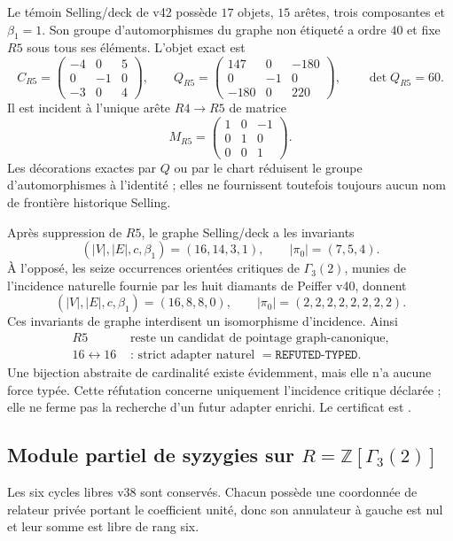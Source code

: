 \documentclass[11pt,a4paper]{article}
\begin{document}
Le témoin Selling/deck de v42 possède $17$ objets, $15$ arêtes, trois composantes et $\beta_1=1$. Son groupe d'automorphismes du graphe non étiqueté a ordre $40$ et fixe $R5$ sous tous ses éléments. L'objet exact est
\[
 C_{R5}=\begin{pmatrix}-4&0&5\\0&-1&0\\-3&0&4\end{pmatrix},
 \qquad
 Q_{R5}=\begin{pmatrix}147&0&-180\\0&-1&0\\-180&0&220\end{pmatrix},
 \qquad \det Q_{R5}=60.
\]
Il est incident à l'unique arête $R4\to R5$ de matrice
\[
 M_{R5}=\begin{pmatrix}1&0&-1\\0&1&0\\0&0&1\end{pmatrix}.
\]
Les décorations exactes par $Q$ ou par le chart réduisent le groupe d'automorphismes à l'identité ; elles ne fournissent toutefois toujours aucun nom de frontière historique Selling.

Après suppression de $R5$, le graphe Selling/deck a les invariants
\[
 (|V|,|E|,c,\beta_1)=(16,14,3,1),
 \qquad
 |\pi_0|=(7,5,4).
\]
À l'opposé, les seize occurrences orientées critiques de $\Gamma_3(2)$, munies de l'incidence naturelle fournie par les huit diamants de Peiffer v40, donnent
\[
 (|V|,|E|,c,\beta_1)=(16,8,8,0),
 \qquad
 |\pi_0|=(2,2,2,2,2,2,2,2).
\]
Ces invariants de graphe interdisent un isomorphisme d'incidence. Ainsi
\[
 \boxed{\begin{aligned}
 R5&\text{ reste un candidat de pointage graph-canonique,}\\
 16\leftrightarrow16&\text{ : strict adapter naturel }=\texttt{REFUTED-TYPED}.
 \end{aligned}}
\]
Une bijection abstraite de cardinalité existe évidemment, mais elle n'a aucune force typée. Cette réfutation concerne uniquement l'incidence critique déclarée ; elle ne ferme pas la recherche d'un futur adapter enrichi. Le certificat est .

\subsection{Module partiel de syzygies sur $R=\mathbb Z[\Gamma_3(2)]$}

Les six cycles libres v38 sont conservés. Chacun possède une coordonnée de relateur privée portant le coefficient unité, donc son annulateur à gauche est nul et leur somme est libre de rang six.
\end{document}
